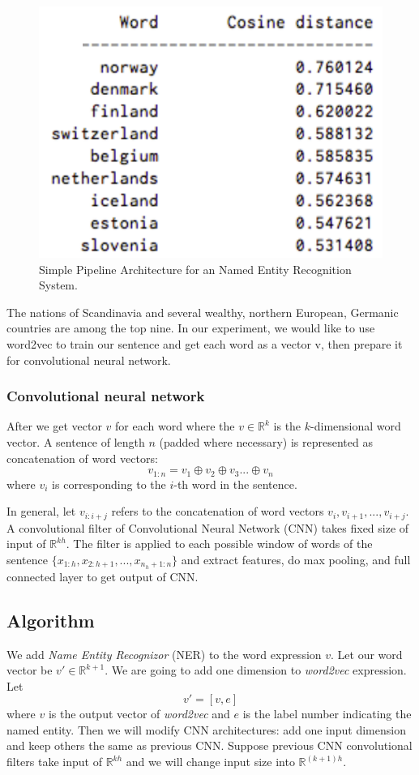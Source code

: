 \documentclass[10pt,twocolumn,letterpaper]{article}
\begin{document}
\begin{figure}
\includegraphics[width=\linewidth]{word2vec}
\caption{Simple Pipeline Architecture for an Named Entity Recognition System. }
\label{fig:word2vec}
\end{figure}
The nations of Scandinavia and several wealthy, northern European, Germanic countries are among the top nine. \cite{bahrampour2015comparative}
In our experiment, we would like to use word2vec to train our sentence and get each word as a vector v, then prepare it for convolutional neural network.

\subsubsection{Convolutional neural network}
After we get vector $v$ for each word where the $v \in \mathbb{R}^k$ is the $k$-dimensional word vector. A sentence of length $n$ (padded where necessary) is represented as concatenation of word vectors:
$$v_{1:n} = v_1 \oplus v_2 \oplus v_3 ... \oplus v_n$$
where $v_i$ is corresponding to the $i$-th word in the sentence. 

In general, let $v_{i:i+j}$ refers to the concatenation of word vectors $v_i, v_{i+1}, ..., v_{i+j}$. A convolutional filter of Convolutional Neural Network (CNN)  \cite{kim2014convolutional} takes fixed size of input of $\mathbb{R}^{kh}$. The filter is applied to each possible window of words of the sentence $\{x_{1:h}, x_{2:h+1}, ..., x_{n_h+1:n}\}$ and extract features, do max pooling, and full connected layer to get output of CNN.



\subsection{Algorithm}
We add \textit{Name Entity Recognizor} (NER) to the word expression $v$. Let our word vector be $v' \in \mathbb{R}^{k+1}$. We are going to add one dimension to \textit{word2vec} expression. Let
$$v' = [v, e]$$
where $v$ is the output vector of \textit{word2vec} and $e$ is the label number indicating the named entity. Then we will modify CNN architectures: add one input dimension and keep others the same as previous CNN. Suppose previous CNN convolutional filters take input of $\mathbb{R}^{kh}$ and we will change input size into $\mathbb{R}^{(k+1)h}$. 
\end{document}

